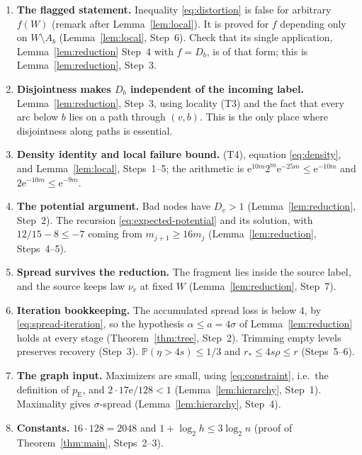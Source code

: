 \documentclass[11pt]{article}
\numberwithin{equation}{section}
\theoremstyle{remark}
\newcommand{\PP}{\mathbb P}
\newcommand{\pE}{p_{\mathrm E}}
\newcommand{\ee}{\mathrm e}
\begin{document}
\begin{enumerate}[label=\arabic*.,leftmargin=2em,itemsep=3pt]
 \item \textbf{The flagged statement.} Inequality \eqref{eq:distortion}
 is false for arbitrary $f(W)$ (remark after Lemma~\ref{lem:local}). It
 is proved for $f$ depending only on $W\setminus A_b$
 (Lemma~\ref{lem:local}, Step~6). Check that its single application,
 Lemma~\ref{lem:reduction} Step~4 with $f=D_b$, is of that form; this is
 Lemma~\ref{lem:reduction}, Step~3.
 \item \textbf{Disjointness makes $D_b$ independent of the incoming
 label.} Lemma~\ref{lem:reduction}, Step~3, using locality (T3) and the
 fact that every arc below $b$ lies on a path through $(v,b)$. This is
 the only place where disjointness along paths is essential.
 \item \textbf{Density identity and local failure bound.} (T4),
 equation \eqref{eq:density}, and Lemma~\ref{lem:local}, Steps~1--5; the
 arithmetic is $\ee^{10m}2^m\ee^{-25m}\le\ee^{-10m}$ and
 $2\ee^{-10m}\le\ee^{-9m}$.
 \item \textbf{The potential argument.} Bad nodes have $D_v>1$
 (Lemma~\ref{lem:reduction}, Step~2). The recursion
 \eqref{eq:expected-potential} and its solution, with
 $12/15-8\le-7$ coming from $m_{j+1}\ge16m_j$
 (Lemma~\ref{lem:reduction}, Steps~4--5).
 \item \textbf{Spread survives the reduction.} The fragment lies inside
 the source label, and the source keeps law $\nu_v$ at fixed $W$
 (Lemma~\ref{lem:reduction}, Step~7).
 \item \textbf{Iteration bookkeeping.} The accumulated spread loss is
 below $4$, by \eqref{eq:spread-iteration}, so the hypothesis
 $\alpha\le a=4\sigma$ of Lemma~\ref{lem:reduction} holds at every stage
 (Theorem~\ref{thm:tree}, Step~2). Trimming empty levels preserves
 recovery (Step~3). $\PP(\eta>4s)\le1/3$ and $r_*\le4s\rho\le r$
 (Steps~5--6).
 \item \textbf{The graph input.} Maximizers are small, using
 \eqref{eq:constraint}, i.e.\ the definition of $\pE$, and
 $2\cdot17\ee/128<1$ (Lemma~\ref{lem:hierarchy}, Step~1). Maximality
 gives $\sigma$-spread (Lemma~\ref{lem:hierarchy}, Step~4).
 \item \textbf{Constants.} $16\cdot128=2048$ and
 $1+\log_2h\le3\log_2n$ (proof of Theorem~\ref{thm:main}, Steps~2--3).
\end{enumerate}
\end{document}
